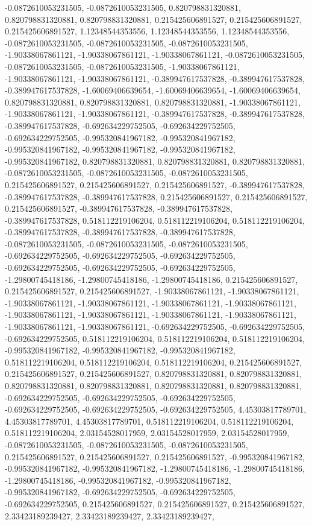 \documentclass[
  ,man]{apa6}
\begin{document}
-0.0872610053231505, -0.0872610053231505, 0.820798831320881, 0.820798831320881, 0.820798831320881, 0.215425606891527, 0.215425606891527, 0.215425606891527, 1.12348544353556, 1.12348544353556, 1.12348544353556, -0.0872610053231505, -0.0872610053231505, -0.0872610053231505, -1.90338067861121, -1.90338067861121, -1.90338067861121, -0.0872610053231505, -0.0872610053231505, -0.0872610053231505, -1.90338067861121, -1.90338067861121, -1.90338067861121, -0.389947617537828, -0.389947617537828, -0.389947617537828,
-1.60069406639654, -1.60069406639654, -1.60069406639654, 0.820798831320881, 0.820798831320881, 0.820798831320881, -1.90338067861121, -1.90338067861121, -1.90338067861121, -0.389947617537828, -0.389947617537828, -0.389947617537828, -0.692634229752505, -0.692634229752505, -0.692634229752505, -0.995320841967182, -0.995320841967182, -0.995320841967182, -0.995320841967182, -0.995320841967182, -0.995320841967182, 0.820798831320881, 0.820798831320881, 0.820798831320881, -0.0872610053231505, -0.0872610053231505,
-0.0872610053231505, 0.215425606891527, 0.215425606891527, 0.215425606891527, -0.389947617537828, -0.389947617537828, -0.389947617537828, 0.215425606891527, 0.215425606891527, 0.215425606891527, -0.389947617537828, -0.389947617537828, -0.389947617537828, 0.518112219106204, 0.518112219106204, 0.518112219106204, -0.389947617537828, -0.389947617537828, -0.389947617537828, -0.0872610053231505, -0.0872610053231505, -0.0872610053231505, -0.692634229752505, -0.692634229752505, -0.692634229752505, -0.692634229752505,
-0.692634229752505, -0.692634229752505, -1.29800745418186, -1.29800745418186, -1.29800745418186, 0.215425606891527, 0.215425606891527, 0.215425606891527, -1.90338067861121, -1.90338067861121, -1.90338067861121, -1.90338067861121, -1.90338067861121, -1.90338067861121, -1.90338067861121, -1.90338067861121, -1.90338067861121, -1.90338067861121, -1.90338067861121, -1.90338067861121, -0.692634229752505, -0.692634229752505, -0.692634229752505, 0.518112219106204, 0.518112219106204, 0.518112219106204, -0.995320841967182,
-0.995320841967182, -0.995320841967182, 0.518112219106204, 0.518112219106204, 0.518112219106204, 0.215425606891527, 0.215425606891527, 0.215425606891527, 0.820798831320881, 0.820798831320881, 0.820798831320881, 0.820798831320881, 0.820798831320881, 0.820798831320881, -0.692634229752505, -0.692634229752505, -0.692634229752505, -0.692634229752505, -0.692634229752505, -0.692634229752505, 4.45303817789701, 4.45303817789701, 4.45303817789701, 0.518112219106204, 0.518112219106204, 0.518112219106204, 2.03154528017959,
2.03154528017959, 2.03154528017959, -0.0872610053231505, -0.0872610053231505, -0.0872610053231505, 0.215425606891527, 0.215425606891527, 0.215425606891527, -0.995320841967182, -0.995320841967182, -0.995320841967182, -1.29800745418186, -1.29800745418186, -1.29800745418186, -0.995320841967182, -0.995320841967182, -0.995320841967182, -0.692634229752505, -0.692634229752505, -0.692634229752505, 0.215425606891527, 0.215425606891527, 0.215425606891527, 2.33423189239427, 2.33423189239427, 2.33423189239427,
\end{document}
